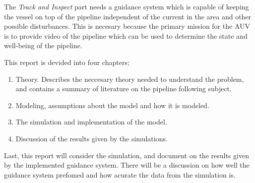 	The \textit{Track and Inspect} part needs a guidance system which is capable of keeping the vessel on top of the pipeline independent of the current in the area and other possible disturbances. This is necesary because the primary mission for the AUV is to provide video of the pipeline which can be used to determine the state and well-being of the pipeline.
	
	This report is devided into four chapters;
	\begin{enumerate}
	 \item Theory. Describes the neccesary theory needed to understand the problem, and contains a summary of literature on the pipeline following subject.
	 \item Modeling, assumptions about the model and how it is modeled.
	 \item The simulation and implementation of the model.
	 \item Discussion of the results given by the simulations.
	\end{enumerate}

	Last, this report will consider the simulation, and document on the results given by the implemented guidance system. There will be a discussion on how well the guidance system prefomed and how acurate the data from the simulation is. 
	
	
	

